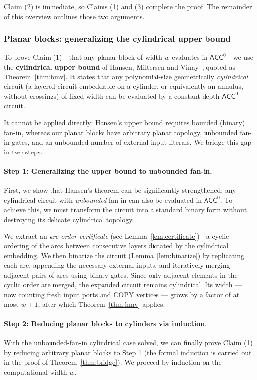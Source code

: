 \documentclass[11pt]{article}
\theoremstyle{definition}
\theoremstyle{remark}
\newcommand{\ACC}{\mathsf{ACC}^0}
\begin{document}
Claim (2) is immediate, so Claims (1) and (3) complete the proof. The remainder of this overview outlines those two arguments.

\subsubsection{Planar blocks: generalizing the cylindrical upper bound}\label{sec:ov-planar-blocks}

To prove Claim (1)---that any planar block of width $w$ evaluates in $\ACC$---we use the \textbf{cylindrical upper bound} of Hansen, Miltersen and Vinay~\cite{HMV02,Hansen03}, quoted as Theorem~\ref{thm:hmv}. It states that any polynomial-size geometrically \emph{cylindrical} circuit (a layered circuit embeddable on a cylinder, or equivalently an annulus, without crossings) of fixed width can be evaluated by a constant-depth $\ACC$ circuit.

It cannot be applied directly: Hansen's upper bound requires bounded (binary) fan-in, whereas our planar blocks have arbitrary planar topology, unbounded fan-in gates, and an unbounded number of external input literals. We bridge this gap in two steps.

\paragraph{Step 1: Generalizing the upper bound to unbounded fan-in.}
First, we show that Hansen's theorem can be significantly strengthened: any cylindrical circuit with \emph{unbounded} fan-in can also be evaluated in $\ACC$. To achieve this, we must transform the circuit into a standard binary form without destroying its delicate cylindrical topology.

We extract an \emph{arc-order certificate} (see Lemma~\ref{lem:certificate})---a cyclic ordering of the arcs between consecutive layers dictated by the cylindrical embedding. We then binarize the circuit (Lemma~\ref{lem:binarize}) by replicating each arc, appending the necessary external inputs, and iteratively merging adjacent pairs of arcs using binary gates. Since only adjacent elements in the cyclic order are merged, the expanded circuit remains cylindrical. Its width --- now counting fresh input ports and $\mathrm{COPY}$ vertices --- grows by a factor of at most $w+1$, after which Theorem~\ref{thm:hmv} applies.

\paragraph{Step 2: Reducing planar blocks to cylinders via induction.}
With the unbounded-fan-in cylindrical case solved, we can finally prove Claim (1) by reducing arbitrary planar blocks to Step 1 (the formal induction is carried out in the proof of Theorem~\ref{thm:bridge}). We proceed by induction on the computational width $w$.
\end{document}
